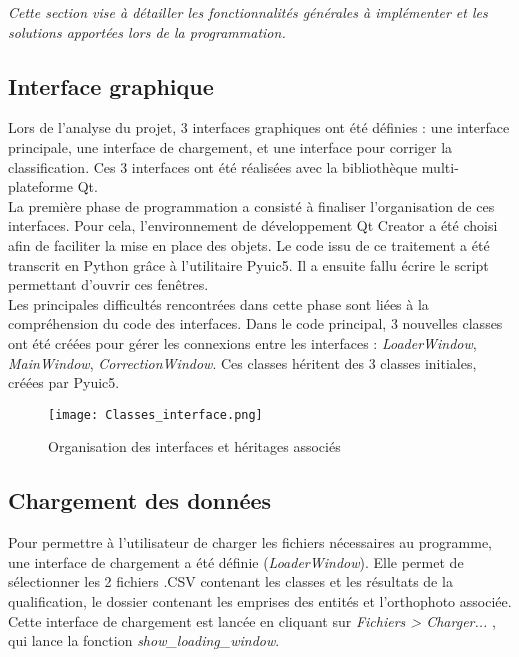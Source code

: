 \textit{Cette section vise à détailler les fonctionnalités générales à implémenter et les solutions apportées lors de la programmation.}

\subsection{Interface graphique}

Lors de l'analyse du projet, 3 interfaces graphiques ont été définies : une interface principale, une interface de chargement, et une interface pour corriger la classification. Ces 3 interfaces ont été réalisées avec la bibliothèque multi-plateforme Qt.\\

La première phase de programmation a consisté à finaliser l'organisation de ces interfaces. Pour cela, l'environnement de développement Qt Creator a été choisi afin de faciliter la mise en place des objets. Le code issu de ce traitement a été transcrit en Python grâce à l'utilitaire Pyuic5. Il a ensuite fallu écrire le script permettant d'ouvrir ces fenêtres. \\

Les principales difficultés rencontrées dans cette phase sont liées à la compréhension du code des interfaces. Dans le code principal, 3 nouvelles classes ont été créées pour gérer les connexions entre les interfaces : \textit{LoaderWindow}, \textit{MainWindow}, \textit{CorrectionWindow}. Ces classes héritent des 3 classes initiales, créées par Pyuic5.

\begin{figure}[!h]
	\begin{center}
		\texttt{[image: Classes\_interface.png]}  
		\caption[Organisation des interfaces et héritages associés]{Organisation des interfaces et héritages associés}
		\label{fig:classeinterface}
	\end{center}
\end{figure}

\subsection{Chargement des données}

Pour permettre à l'utilisateur de charger les fichiers nécessaires au programme, une interface de chargement a été définie (\textit{LoaderWindow}). Elle permet de  sélectionner les 2 fichiers .CSV contenant les classes et les résultats de la qualification, le dossier contenant les emprises des entités et l'orthophoto associée. Cette interface de chargement est lancée en cliquant sur \textit{Fichiers > Charger...} , qui lance la fonction \textit{show\_loading\_window}.\\

